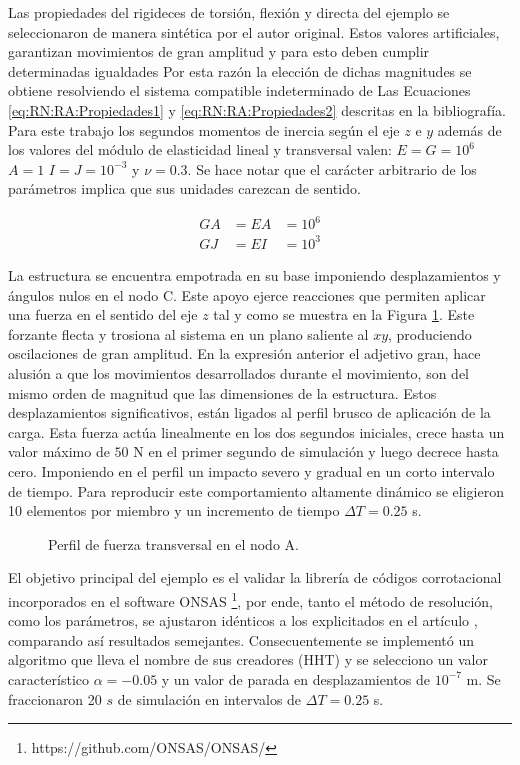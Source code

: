Las propiedades del rigideces de torsión, flexión y directa del ejemplo se seleccionaron de manera sintética por el autor original. Estos valores artificiales, garantizan movimientos de gran amplitud y para esto deben cumplir determinadas igualdades Por esta razón la elección de dichas magnitudes se obtiene resolviendo el sistema compatible indeterminado de Las Ecuaciones \eqref{eq:RN:RA:Propiedades1} y \eqref{eq:RN:RA:Propiedades2} descritas en la bibliografía. Para este trabajo los segundos momentos de inercia según el eje $z$ e $y$ además de los valores del módulo de elasticidad lineal y transversal valen: $ E=G=10^6$ $A=1 $  $I=J=10^{-3}$ y $\nu=0.3$. Se hace notar que el carácter arbitrario de los parámetros implica que sus unidades carezcan de sentido. 

\begin{eqnarray}\label{eq:RN:RA:Propiedades1}
	GA &= EA& =10^6\\\label{eq:RN:RA:Propiedades2}
	GJ &= EI& =10^3
\end{eqnarray}

La estructura se encuentra empotrada en su base imponiendo desplazamientos y ángulos nulos en el nodo C. Este apoyo ejerce reacciones que permiten aplicar una fuerza en el sentido del eje $z$ tal y como se muestra en la Figura \ref{fig:RN:RA:Force}. Este forzante flecta y trosiona al sistema en un plano saliente al $xy$, produciendo oscilaciones de gran amplitud. En la expresión anterior el adjetivo gran, hace alusión a que los movimientos desarrollados durante el movimiento, son del mismo orden de magnitud que las dimensiones de la estructura. Estos desplazamientos significativos, están ligados al perfil brusco de aplicación de la carga. Esta fuerza actúa linealmente en los dos segundos iniciales, crece hasta un valor máximo de $50$ N en el primer segundo de simulación y luego decrece hasta cero. Imponiendo en el perfil un impacto severo y gradual en un corto intervalo de tiempo. Para reproducir este comportamiento altamente dinámico se eligieron 10 elementos por miembro y un incremento de tiempo $\Delta T = 0.25$ s. 


\begin{figure}[htbp]
	\centering
	\def\svgwidth{80mm}
	
	\caption{Perfil de fuerza transversal en el nodo A.}
	\label{fig:RN:RA:Force}
\end{figure}

El objetivo principal del ejemplo es el validar la librería de códigos corrotacional incorporados en el software ONSAS \footnote{https://github.com/ONSAS/ONSAS/}, por ende, tanto el método de resolución, como los parámetros, se ajustaron idénticos a los explicitados en el artículo \cite{Le2014}, comparando así resultados semejantes. Consecuentemente se implementó un algoritmo que lleva el nombre de sus creadores (HHT) y se selecciono un valor característico $\alpha=-0.05$ y un valor de parada en desplazamientos de $10^{-7}$ m. Se fraccionaron 20 $s$ de simulación en intervalos de $\Delta T=0.25$ s.

